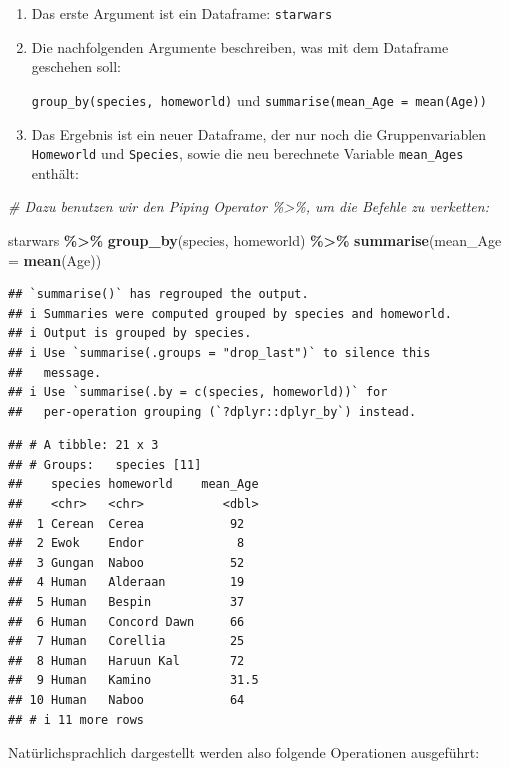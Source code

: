 \documentclass[
  ngerman,
]{book}
\newenvironment{Shaded}{\begin{snugshade}}{\end{snugshade}}
\newcommand{\AttributeTok}[1]{\textcolor[rgb]{0.13,0.29,0.53}{#1}}
\newcommand{\CommentTok}[1]{\textcolor[rgb]{0.56,0.35,0.01}{\textit{#1}}}
\newcommand{\FunctionTok}[1]{\textcolor[rgb]{0.13,0.29,0.53}{\textbf{#1}}}
\newcommand{\NormalTok}[1]{#1}
\newcommand{\SpecialCharTok}[1]{\textcolor[rgb]{0.81,0.36,0.00}{\textbf{#1}}}
\begin{document}
\begin{enumerate}
\def\labelenumi{\arabic{enumi}.}
\item
  Das erste Argument ist ein Dataframe: \texttt{starwars}
\item
  Die nachfolgenden Argumente beschreiben, was mit dem Dataframe geschehen soll:

  \texttt{group\_by(species,\ homeworld)} und \texttt{summarise(mean\_Age\ =\ mean(Age))}
\item
  Das Ergebnis ist ein neuer Dataframe, der nur noch die Gruppenvariablen \texttt{Homeworld} und \texttt{Species}, sowie die neu berechnete Variable \texttt{mean\_Ages} enthält:
\end{enumerate}

\begin{Shaded}
\begin{Highlighting}[]
\CommentTok{\# Dazu benutzen wir den Piping Operator \%\textgreater{}\%, um die Befehle zu verketten:}

\NormalTok{starwars }\SpecialCharTok{\%\textgreater{}\%} 
  \FunctionTok{group\_by}\NormalTok{(species, homeworld) }\SpecialCharTok{\%\textgreater{}\%} 
  \FunctionTok{summarise}\NormalTok{(}\AttributeTok{mean\_Age =} \FunctionTok{mean}\NormalTok{(Age))}
\end{Highlighting}
\end{Shaded}

\begin{verbatim}
## `summarise()` has regrouped the output.
## i Summaries were computed grouped by species and homeworld.
## i Output is grouped by species.
## i Use `summarise(.groups = "drop_last")` to silence this
##   message.
## i Use `summarise(.by = c(species, homeworld))` for
##   per-operation grouping (`?dplyr::dplyr_by`) instead.
\end{verbatim}

\begin{verbatim}
## # A tibble: 21 x 3
## # Groups:   species [11]
##    species homeworld    mean_Age
##    <chr>   <chr>           <dbl>
##  1 Cerean  Cerea            92  
##  2 Ewok    Endor             8  
##  3 Gungan  Naboo            52  
##  4 Human   Alderaan         19  
##  5 Human   Bespin           37  
##  6 Human   Concord Dawn     66  
##  7 Human   Corellia         25  
##  8 Human   Haruun Kal       72  
##  9 Human   Kamino           31.5
## 10 Human   Naboo            64  
## # i 11 more rows
\end{verbatim}

Natürlichsprachlich dargestellt werden also folgende Operationen ausgeführt:
\end{document}
